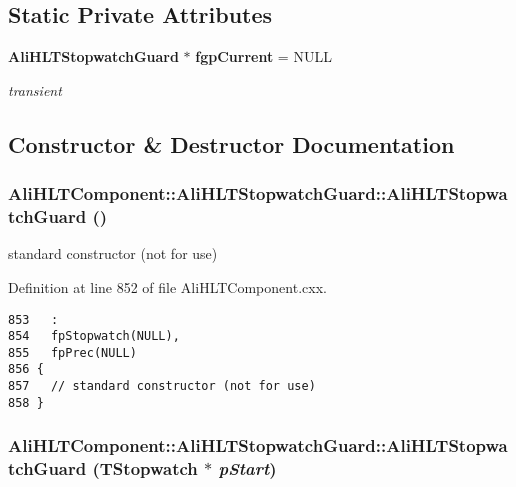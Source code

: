 \subsection*{Static Private Attributes}
\begin{CompactItemize}
\item 
{\bf Ali\-HLTStopwatch\-Guard} $\ast$ {\bf fgp\-Current} = NULL
\begin{CompactList}\small\item\em transient \item\end{CompactList}\end{CompactItemize}


\subsection{Constructor \& Destructor Documentation}
\subsubsection{\setlength{\rightskip}{0pt plus 5cm}Ali\-HLTComponent::Ali\-HLTStopwatch\-Guard::Ali\-HLTStopwatch\-Guard ()}\label{classAliHLTComponent_1_1AliHLTStopwatchGuard_a0}


standard constructor (not for use) 

Definition at line 852 of file Ali\-HLTComponent.cxx.

\footnotesize\begin{verbatim}853   :
854   fpStopwatch(NULL),
855   fpPrec(NULL)
856 {
857   // standard constructor (not for use)
858 }

\end{verbatim}\normalsize 


\subsubsection{\setlength{\rightskip}{0pt plus 5cm}Ali\-HLTComponent::Ali\-HLTStopwatch\-Guard::Ali\-HLTStopwatch\-Guard (TStopwatch $\ast$ {\em p\-Start})}\label{classAliHLTComponent_1_1AliHLTStopwatchGuard_a1}


